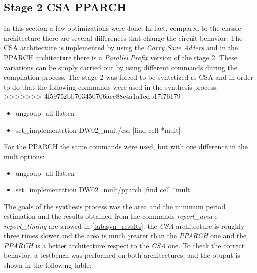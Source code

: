 \subsection{Stage 2 CSA PPARCH}
In this section a few optimizations were done. In fact, compared to the classic architecture there are several differences that change the circuit behavior. The CSA architecture is implemented by using the \textit{Carry Save Adders} and in the PPARCH architecture there is a \textit{Parallel Prefix} version of the stage 2. These variations can be simply carried out by using different commands during the compilation process. The stage 2 was forced to be syntetized as CSA and in order to do that the following commands were used in the synthesis process:
>>>>>>> 4f59752bb703450706aee88c4a1a1cdb17f76179

\begin{itemize}
\item ungroup -all flatten
\item set\_implementation DW02\_mult/csa [find cell *mult]
\end{itemize}
For the PPARCH the same commands were used, but with one difference in the mult options:
\begin{itemize}
\item ungroup -all flatten
\item set\_implementation DW02\_mult/pparch [find cell *mult]
\end{itemize}
The goals of the synthesis process was the area and the minimum period estimation and the results obtained from the commands \textit{report\_area} e \textit{report\_timing} are showed in \autoref{tab:syn_results}: the \textit{CSA} architecture is roughly three times slower and the area is much greater than the \textit{PPARCH} one and the \textit{PPARCH} is a better architecture respect to the \textit{CSA} one.
To check the correct behavior, a testbench was performed on both architectures, and the otuput is shown in the following table:

